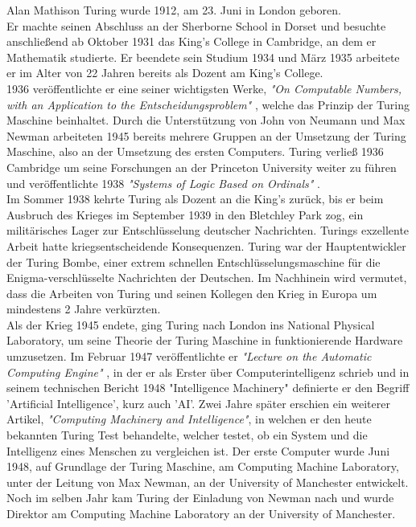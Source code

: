 Alan Mathison Turing wurde 1912, am 23. Juni in London geboren.\\
Er machte seinen Abschluss an der Sherborne School in Dorset und besuchte anschließend ab Oktober 1931 das King's College in Cambridge, an dem er Mathematik studierte. Er beendete sein Studium 1934 und März 1935 arbeitete er im Alter von 22 Jahren bereits als Dozent am King's College.\\
1936 veröffentlichte er eine seiner wichtigsten Werke, \textit{"On Computable Numbers, with an Application to the Entscheidungsproblem"} , welche das Prinzip der Turing Maschine beinhaltet. Durch die Unterstützung von John von Neumann und Max Newman arbeiteten 1945 bereits mehrere Gruppen an der Umsetzung der Turing Maschine, also an der Umsetzung des ersten Computers. Turing verließ 1936 Cambridge um seine Forschungen an der Princeton University weiter zu führen und veröffentlichte 1938 \textit{"Systems of Logic Based on Ordinals"} .\\
Im Sommer 1938 kehrte Turing als Dozent an die King's zurück, bis er beim Ausbruch des Krieges im September 1939 in den Bletchley Park zog, ein militärisches Lager zur Entschlüsselung deutscher Nachrichten. Turings exzellente Arbeit hatte kriegsentscheidende Konsequenzen. Turing war der Hauptentwickler der Turing Bombe, einer extrem schnellen Entschlüsselungsmaschine für die Enigma-verschlüsselte Nachrichten der Deutschen. Im Nachhinein wird vermutet, dass die Arbeiten von Turing und seinen Kollegen den Krieg in Europa um mindestens 2 Jahre verkürzten.\\
Als der Krieg 1945 endete, ging Turing nach London ins National Physical Laboratory, um seine Theorie der Turing Maschine in funktionierende Hardware umzusetzen. Im Februar 1947 veröffentlichte er \textit{"Lecture on the Automatic Computing Engine"} , in der er als Erster über Computerintelligenz schrieb und in seinem technischen Bericht 1948 "Intelligence Machinery" definierte er den Begriff 'Artificial Intelligence', kurz auch 'AI'. Zwei Jahre später erschien ein weiterer Artikel, \textit{"Computing Machinery and Intelligence"}, in welchen er den heute bekannten Turing Test behandelte, welcher testet, ob ein System und die Intelligenz eines Menschen zu vergleichen ist.
Der erste Computer wurde Juni 1948, auf Grundlage der Turing Maschine, am Computing Machine Laboratory, unter der Leitung von Max Newman, an der University of Manchester entwickelt. Noch im selben Jahr kam Turing der Einladung von Newman nach und wurde Direktor am Computing Machine Laboratory an der University of Manchester.\\
